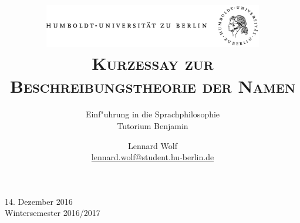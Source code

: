\documentclass[a4paper, emulatestandardclasses, 12pt]{scrartcl}
\date{\vspace{-3ex}}
\begin{document}
\title{\vspace{5ex}
	\includegraphics*[width=0.72\textwidth]{images/hu_logo.png}\\
	\vspace{30pt}
	\scshape\LARGE{Kurzessay zur\\Beschreibungstheorie der Namen}}
	
	\subtitle{\vspace{20pt}Einf"uhrung in die Sprachphilosophie\\
          \vspace{6pt}
          Tutorium Benjamin\\}


\author{\vspace{-4pt}Lennard Wolf\\
        \small{\href{mailto:lennard.wolf@student.hu-berlin.de}{lennard.wolf@student.hu-berlin.de}}}      

\maketitle

\vspace{\fill}

\begin{minipage}[b]{\textwidth}
    \centering
    \onehalfspacing
    \large   
    14. Dezember 2016\\
    Wintersemester 2016/2017

    \vspace{-20mm} 
\end{minipage}%
\thispagestyle{empty}
\newpage
\clearpage
\setcounter{page}{1}
\end{document}
